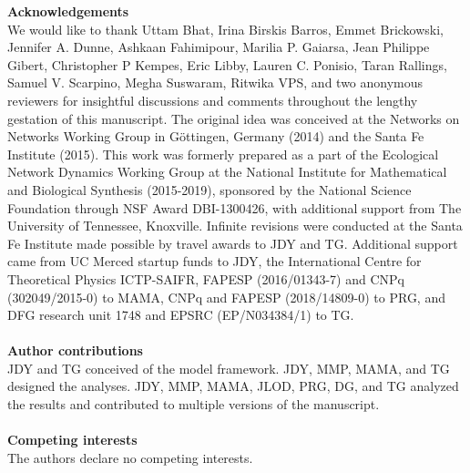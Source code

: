 \documentclass[twocolumn,preprintnumbers,amsmath,amssymb,superscriptaddress,linenumbers]{revtex4-1}
\newcommand{\beginsupplement}{%
        \clearpage
        \setcounter{table}{0}
        \renewcommand{\thetable}{S\arabic{table}}%
        \setcounter{figure}{0}
        \renewcommand{\thefigure}{S\arabic{figure}}%
        \setcounter{equation}{0}
        \renewcommand{\theequation}{S\arabic{equation}}
     }
\providecommand{\DIFdelbegin}{} %
\providecommand{\DIFdelend}{} %
\newcommand{\DIFscaledelfig}{0.5}
\newlength{\DIFdelgraphicswidth} %
\newlength{\DIFdelgraphicsheight} %
\newcommand{\DIFdelincludegraphics}[2][]{%
\sbox{\DIFdelgraphicsbox}{\DIFOincludegraphics[#1]{#2}}%
\settoboxwidth{\DIFdelgraphicswidth}{\DIFdelgraphicsbox} %
\settoboxtotalheight{\DIFdelgraphicsheight}{\DIFdelgraphicsbox} %
\scalebox{\DIFscaledelfig}{%
\parbox[b]{\DIFdelgraphicswidth}{\usebox{\DIFdelgraphicsbox}\\[-\baselineskip] \rule{\DIFdelgraphicswidth}{0em}}\llap{\resizebox{\DIFdelgraphicswidth}{\DIFdelgraphicsheight}{%
\setlength{\unitlength}{\DIFdelgraphicswidth}%
\begin{picture}(1,1)%
\thicklines\linethickness{2pt} %
{\color[rgb]{1,0,0}\put(0,0){\framebox(1,1){}}}%
{\color[rgb]{1,0,0}\put(0,0){\line( 1,1){1}}}%
{\color[rgb]{1,0,0}\put(0,1){\line(1,-1){1}}}%
\end{picture}%
}\hspace*{3pt}}} %
} %
\DeclareRobustCommand{\DIFdelbegin}{\DIFOdelbegin \let\includegraphics\DIFdelincludegraphics} %
\DeclareRobustCommand{\DIFdelend}{\DIFOaddend \let\includegraphics\DIFOincludegraphics} %
\begin{document}
\DIFdelbegin %
\DIFdelend %


\vspace{2mm}
\noindent \textbf{Acknowledgements}\\
  \footnotesize{
  We would like to thank
  Uttam Bhat,
  Irina Birskis Barros,
  Emmet Brickowski,
  Jennifer A. Dunne,
  Ashkaan Fahimipour,
  Marilia P. Gaiarsa,
  Jean Philippe Gibert,
  Christopher P Kempes,
  Eric Libby,
  Lauren C. Ponisio,
  Taran Rallings,
  Samuel V. Scarpino,
  Megha Suswaram,
  Ritwika VPS,
  and two anonymous reviewers
  for insightful discussions and comments throughout the lengthy gestation of this manuscript.
  The original idea was conceived at the Networks on Networks Working Group in G\"ottingen, Germany (2014) and the Santa Fe Institute (2015).
  This work was formerly prepared as a part of the Ecological Network Dynamics Working Group at the National Institute for Mathematical and Biological Synthesis (2015-2019), sponsored by the National Science Foundation through NSF Award DBI-1300426, with additional support from The University of Tennessee, Knoxville.
  Infinite revisions were conducted at the Santa Fe Institute made possible by travel awards to JDY and TG.
  Additional support came from UC Merced startup funds to JDY, the International Centre for Theoretical Physics ICTP-SAIFR, FAPESP (2016/01343-7) and CNPq (302049/2015-0) to MAMA, CNPq and FAPESP (2018/14809-0) to PRG, and DFG research unit 1748 and EPSRC (EP/N034384/1) to TG.
  }\\ \\

\noindent \textbf{Author contributions}\\
  \footnotesize{
  JDY and TG conceived of the model framework. JDY, MMP, MAMA, and TG designed the analyses. JDY, MMP, MAMA, JLOD, PRG, DG, and TG analyzed the results and contributed to multiple versions of the manuscript.
  }\\ \\
\noindent \textbf{Competing interests}\\
  \footnotesize{
  The authors declare no competing interests.
  }
\clearpage

\clearpage
\DIFdelbegin %


\end{document}
